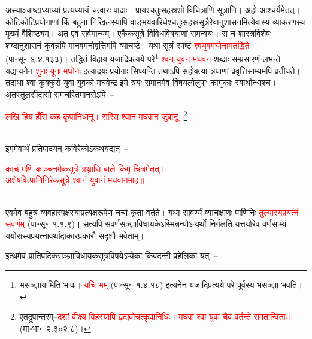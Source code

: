 \begin{sloppypar}\justifying\noindent\hspace{10mm} अस्याञ्चाष्टाध्याय्यां प्रत्यध्यायं चत्वारः पादाः। प्रायश्चतुःसहस्रशो विचित्राणि सूत्राणि। अहो आश्चर्यमेतत्। कोटि\-कोटि\-प्रयोगाणां किं बहुना निखिलस्यापि वाङ्मय\-वारिधेश्चतुःसहस्र\-सूत्रैरेवानुशासनमित्येवास्य व्याकरणस्य मुख्यं वैशिष्ट्यम्। अत एव सर्व\-मान्यम्। एकैक\-सूत्रे विविध\-विषयाणां समन्वयः। स च शास्त्र\-विशेषः शब्दानुशासनं कुर्वन्नपि मानव\-मनो\-वृत्तिमपि व्याचष्टे। यथा सूत्रं स्पष्टं \textcolor{red}{श्वयुव\-मघोनामतद्धिते} (पा॰सू॰~६.४.१३३)। तद्धितं विहाय यजादि\-प्रत्यये परे\footnote{भसञ्ज्ञायामिति भावः। \textcolor{red}{यचि भम्} (पा॰सू॰~१.४.१८) इत्यनेन यजादि\-प्रत्यये परे पूर्वस्य भसञ्ज्ञा भवति।} \textcolor{red}{श्वन् युवन् मघवन्} शब्दाः सम्प्रसारणं लभन्ते। यद्यप्यनेन \textcolor{red}{शुनः यूनः मघोनः} इत्यादयः प्रयोगाः सिध्यन्ति तथाऽपि सहोक्त्या त्रयाणां प्रवृत्ति\-साम्यमपि प्रतीयते। तद्यथा श्वा कुक्कुरो युवा युवको मघवेन्द्र इमे त्रयः समानमेव विषय\-लोलुपाः कामुकाः स्वार्थान्धाश्च। अतस्तुलसी\-दासो रामचरितमानसेऽपि~–\end{sloppypar}
\centering\textcolor{red}{लखि हिय हँसि कह कृपानिधानू। सरिस श्वान मघवान जुबानू॥}\footnote{एतद्रूपान्तरम्–\textcolor{red}{दशां वीक्ष्य विहस्यापि हृद्यवोचत्कृपानिधिः। मघवा श्वा युवा चैव वर्तन्ते समतान्विताः॥} (मा॰भा॰~२.३०२.८)।}
\nopagebreak\\
\\
\begin{sloppypar}\justifying\noindent इममेवार्थं प्रतिपादयन् कविरेकोऽकथयद्यत्~–\end{sloppypar}
\centering\textcolor{red}{काचं मणिं काञ्चनमेकसूत्रे ग्रथ्नासि बाले किमु चित्रमेतत्।\nopagebreak\\
अशेषवित्पाणिनिरेकसूत्रे श्वानं युवानं मघवानमाह॥}\nopagebreak\\
\\
\begin{sloppypar}\justifying\noindent एवमेव बहुत्र व्यवहार\-पक्षस्याप्रत्यक्ष\-रूपेण चर्चा कृता वर्तते। यथा सावर्ण्यं व्याचक्षाणः पाणिनिः \textcolor{red}{तुल्यास्य\-प्रयत्नं सवर्णम्} (पा॰सू॰~१.१.९)। सत्यपि सवर्ण\-सञ्ज्ञा\-विधायकेऽस्मिन्नन्योऽप्यर्थो निर्गलति यत्तयोरेव वर्ण\-साम्यं ययोरास्य\-प्रयत्नावर्थादाकार\-प्रकारौ सदृशौ भवेताम्। \end{sloppypar}
\begin{sloppypar}\justifying\noindent\hspace{10mm} इत्थमेव प्रातिपदिक\-सञ्ज्ञा\-विधायक\-सूत्र\-विषयेऽप्येका किंवदन्ती प्रहेलिका यत्~–\end{sloppypar}
